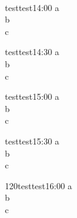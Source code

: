 \documentclass{therapie}[autor=Test\ Autor, thema=Test\ Thema, nummer=1]
\begin{document}
\linie
\lipsum\\[.2cm]

\begin{abschnitt}{00}{test}{test}{14:00}\label{t+00}
a\\
b\\
c
\end{abschnitt}
\begin{abschnitt}{30}{test}{test}{14:30}\label{t+30}
a\\
b\\
c
\end{abschnitt}
\begin{abschnitt}{60}{test}{test}{15:00}\label{t+60}
a\\
b\\
c
\end{abschnitt}
\begin{abschnitt}{90}{test}{test}{15:30}\label{t+90}
a\\
b\\
c
\end{abschnitt}
\begin{abschnitt}{120}{test}{test}{16:00}\label{t+120}
a\\
b\\
c
\end{abschnitt}

\noindent
{}
\linie
\lipsum

\end{document}
